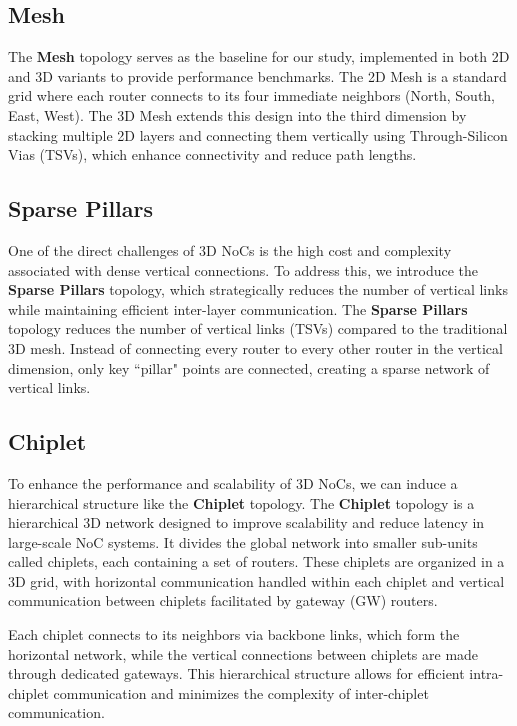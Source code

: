 \documentclass[11pt]{article}
\begin{document}
\subsection{Mesh}

The \textbf{Mesh} topology serves as the baseline for our study, implemented in both 2D and 3D variants to provide performance benchmarks. The 2D Mesh is a standard grid where each router connects to its four immediate neighbors (North, South, East, West). The 3D Mesh extends this design into the third dimension by stacking multiple 2D layers and connecting them vertically using Through-Silicon Vias (TSVs), which enhance connectivity and reduce path lengths.

\subsection{Sparse Pillars}

One of the direct challenges of 3D NoCs is the high cost and complexity associated with dense vertical connections. To address this, we introduce the \textbf{Sparse Pillars} topology, which strategically reduces the number of vertical links while maintaining efficient inter-layer communication. The \textbf{Sparse Pillars} topology reduces the number of vertical links (TSVs) compared to the traditional 3D mesh. Instead of connecting every router to every other router in the vertical dimension, only key ``pillar" points are connected, creating a sparse network of vertical links.

\subsection{Chiplet}

To enhance the performance and scalability of 3D NoCs, we can induce a hierarchical structure like the \textbf{Chiplet} topology.
The \textbf{Chiplet} topology is a hierarchical 3D network designed to improve scalability and reduce latency in large-scale NoC systems. It divides the global network into smaller sub-units called chiplets, each containing a set of routers. These chiplets are organized in a 3D grid, with horizontal communication handled within each chiplet and vertical communication between chiplets facilitated by gateway (GW) routers.

Each chiplet connects to its neighbors via backbone links, which form the horizontal network, while the vertical connections between chiplets are made through dedicated gateways. This hierarchical structure allows for efficient intra-chiplet communication and minimizes the complexity of inter-chiplet communication.
\end{document}

